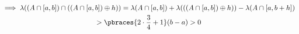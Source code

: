 \begin{solution}
\begin{enumerate}[label = (\arabic*)]
    \begin{multline*}
        \implies
        \lambda((A \cap [a, b]) \cap ((A \cap [a, b]) \oplus h))
        =
        \lambda(A \cap [a, b]) + \lambda(((A \cap [a, b]) \oplus h)) - \lambda(A \cap [a, b + h]) \\
        >
        \pbraces{2 \cdot \frac{3}{4} + 1} (b - a)
        >
        0
    \end{multline*}

\end{enumerate}

\end{solution}

